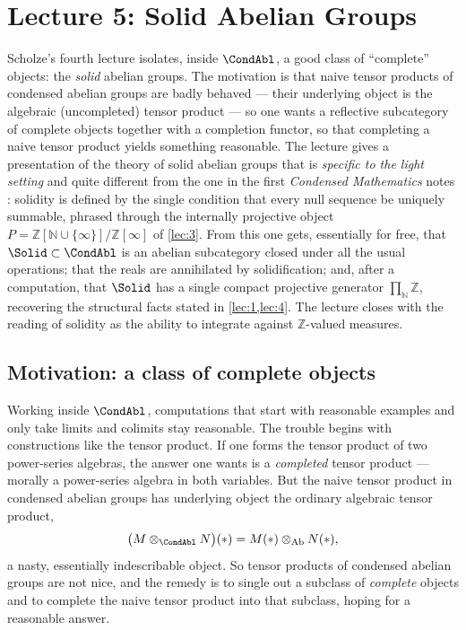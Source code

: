 \section{Lecture 5: Solid Abelian Groups}
\label{lec:5}

Scholze's fourth lecture isolates, inside $\CondAbl$, a good class of
``complete'' objects: the \emph{solid} abelian groups. The motivation is that
naive tensor products of condensed abelian groups are badly behaved --- their
underlying object is the algebraic (uncompleted) tensor product --- so one wants
a reflective subcategory of complete objects together with a completion functor,
so that completing a naive tensor product yields something reasonable. The
lecture gives a presentation of the theory of solid abelian groups that is
\emph{specific to the light setting} and quite different from the one in the
first \emph{Condensed Mathematics} notes \cite{clausen2019condensed}: solidity is
defined by the single condition that every null sequence be uniquely summable,
phrased through the internally projective object $P=\mathbb{Z}[\mathbb{N}\cup
\{\infty\}]/\mathbb{Z}[\infty]$ of \cref{lec:3}. From this one gets, essentially
for free, that $\Solid\subset\CondAbl$ is an abelian subcategory closed under all
the usual operations; that the reals are annihilated by solidification; and,
after a computation, that $\Solid$ has a single compact projective generator
$\prod_{\mathbb{N}}\mathbb{Z}$, recovering the structural facts stated in
\cref{lec:1,lec:4}. The lecture closes with the reading of solidity as the
ability to integrate against $\mathbb{Z}$-valued measures.

\subsection{Motivation: a class of complete objects}

\begin{remark}
\label{rmk:5:tensor-motivation}
Working inside $\CondAbl$, computations that start with reasonable examples and
only take limits and colimits stay reasonable. The trouble begins with
constructions like the tensor product. If one forms the tensor product of two
power-series algebras, the answer one wants is a \emph{completed} tensor product
--- morally a power-series algebra in both variables. But the naive tensor
product in condensed abelian groups has underlying object the ordinary algebraic
tensor product,
\begin{equation*}
\bigl(M\otimes_{\CondAbl}N\bigr)(\ast)=M(\ast)\otimes_{\mathrm{Ab}}N(\ast),
\end{equation*}
a nasty, essentially indescribable object. So tensor products of condensed
abelian groups are not nice, and the remedy is to single out a subclass of
\emph{complete} objects and to complete the naive tensor product into that
subclass, hoping for a reasonable answer.
\end{remark}

